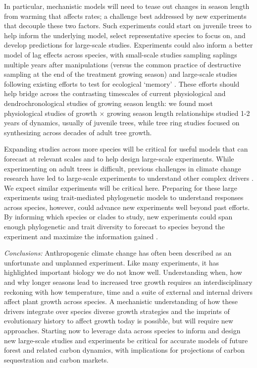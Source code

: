 \documentclass[11pt]{article}
\newcommand{\R}[1]{\label{#1}\linelabel{#1}}
\begin{document}
\R{R2rate3S}In particular, mechanistic models will need to tease out changes in season length from warming that affects rates; a challenge best addressed by new experiments that decouple these two factors. Such experiments could start on juvenile trees to help inform the underlying model, select representative species to focus on, and  develop predictions for large-scale studies. Experiments could also inform a better model of lag effects across species, with small-scale studies sampling saplings multiple years after manipulations (versus the common practice of destructive sampling at the end of the treatment growing season) and large-scale studies following existing efforts to test for ecological `memory'  \citep[e.g. ][]{flinker2021promise,schweiger2022transgenerational,chinmemory}. These efforts should help bridge across the contrasting timescales of current physiological and dendrochronological studies of growing season length: we found most physiological studies of growth $\times$ growing season length relationships studied 1-2 years of dynamics, usually of juvenile trees, while tree ring studies focused on synthesizing across decades of adult tree growth.\R{R2rate3E}

\R{R3complaint5S2}Expanding studies across more species will be critical for useful models that can forecast at relevant scales and to help design large-scale experiments. While experimenting on adult trees is difficult, previous challenges in climate change research have led to large-scale experiments to understand other complex drivers \citep[e.g. SPRUCE, DroughtNet, Pfynwald,][]{norby2011ecological,hanson2017attaining,smith2016drought}. We expect similar experiments will be critical here. Preparing for these large experiments using trait-mediated phylogenetic models to understand responses across species, however, could advance new experiments well beyond past efforts. By informing which species or clades to study, new experiments could span enough phylogenetic and trait diversity to forecast to species beyond the experiment and maximize the information gained \citep{cadotte2017phylogenies}.\R{R3complaint1E}

\emph{Conclusions:} 
Anthropogenic climate change has often been described as an unfortunate and unplanned experiment. Like many experiments, it has highlighted important biology we do not know well. Understanding when, how and why longer seasons lead to increased tree growth requires an interdisciplinary reckoning with how temperature, time and a suite of external and internal drivers affect plant growth across species. A mechanistic understanding of how these drivers integrate over species diverse growth strategies and the imprints of evolutionary history to affect growth today is possible, but will require new approaches.  Starting now to leverage data across species to inform and design new large-scale studies and experiments be critical for accurate models of future forest and related carbon dynamics, with implications for projections of carbon sequestration and carbon markets. 
\end{document}
